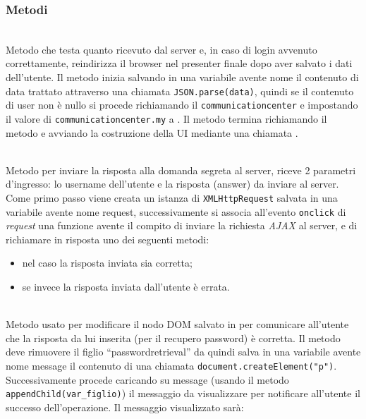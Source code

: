 \subsubsection*{Metodi}
\begin{description}

	\item{}\\
Metodo che testa quanto ricevuto dal server e, in caso di login avvenuto correttamente, reindirizza il browser nel presenter finale dopo aver salvato i dati dell'utente. Il metodo inizia salvando in una variabile avente nome  il contenuto di data trattato attraverso una chiamata \texttt{JSON.parse(data)}, quindi se il contenuto di user non è nullo si procede richiamando il \texttt{communicationcenter} e impostando il valore di \texttt{communicationcenter.my} a . Il metodo termina richiamando il metodo  e avviando la costruzione della UI mediante una chiamata .
	
	\item{}\\
	Metodo per inviare la risposta alla domanda segreta al server, riceve 2 parametri d'ingresso: lo username dell'utente e la risposta (answer) da inviare al server. Come primo passo viene creata un istanza di \texttt{XMLHttpRequest} salvata in una variabile avente nome request, successivamente si associa all'evento \texttt{onclick} di \textit{request} una funzione avente il compito di inviare la richiesta \textit{AJAX} al server, e di richiamare in risposta uno dei seguenti metodi:
	\begin{itemize}
		\item {} nel caso la risposta inviata sia corretta;
		\item {} se invece la risposta inviata dall'utente è errata.
	\end{itemize}
	
	\item{}\\
	Metodo usato per modificare il nodo DOM salvato in  per comunicare all'utente che la risposta da lui inserita (per il recupero password) è corretta. 
Il metodo deve rimuovere il figlio ``passwordretrieval'' da  quindi salva in una variabile avente nome message il contenuto di una chiamata \verb|document.createElement("p")|. 
Successivamente procede caricando su message (usando il metodo \texttt{appendChild(var\_figlio)}) il messaggio da visualizzare per notificare all'utente il successo dell'operazione. Il messaggio visualizzato sarà: \\
	

\end{description}
